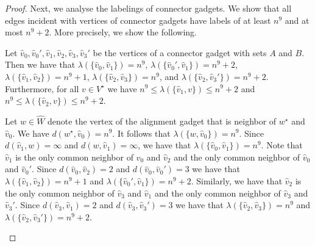 \documentclass[a4paper,UKenglish,cleveref, autoref, thm-restate]{lipics-v2021}
\begin{document}
\begin{proof}
Next, we analyse the labelings of connector gadgets. We show that all edges incident with vertices of connector gadgets have labels of at least $n^9$ and at most $n^9+2$. More precisely, we show the following.
\begin{claim}\label{claim:2}
    Let $\hat{v}_0,\hat{v}_0',\hat{v}_1,\hat{v}_2,\hat{v}_3,\hat{v}_3'$ be the vertices of a connector gadget with sets $A$ and $B$. Then we have that 
        $\lambda(\{\hat{v}_0,\hat{v}_1\})=n^9$,  $\lambda(\{\hat{v}_0',\hat{v}_1\})=n^9+2$,
        $\lambda(\{\hat{v}_1,\hat{v}_2\})=n^9+1$, $\lambda(\{\hat{v}_2,\hat{v}_3\})=n^9$, and $\lambda(\{\hat{v}_2,\hat{v}_3'\})=n^9+2$. 
        Furthermore, for all $v\in V^\star$ we have $n^9\le \lambda(\{\hat{v}_1,v\})\le n^9+2$ and $n^9\le \lambda(\{\hat{v}_2,v\}) \le n^9+2$.
\end{claim}
\begin{claimproof}
    Let $w\in \hat{W}$ denote the vertex of the alignment gadget that is neighbor of $w^\star$ and $\hat{v}_0$. We have $d(w^\star,\hat{v}_0)=n^9$. It follows that $\lambda(\{w,\hat{v}_0\})=n^9$. Since $d(\hat{v}_1,w)=\infty$ and $d(w,\hat{v}_1)=\infty$, we have that $\lambda(\{\hat{v}_0,\hat{v}_1\})=n^9$.
    Note that $\hat{v}_1$ is the only common neighbor of $\hat{v}_0$ and $\hat{v}_2$ and the only common neighbor of $\hat{v}_0$ and $\hat{v}_0'$. Since $d(\hat{v}_0,\hat{v}_2)=2$ and $d(\hat{v}_0,\hat{v}_0')=3$ we have that $\lambda(\{\hat{v}_1,\hat{v}_2\})=n^9+1$ and $\lambda(\{\hat{v}_0',\hat{v}_1\})=n^9+2$. Similarly, we have that $\hat{v}_2$ is the only common neighbor of $\hat{v}_3$ and $\hat{v}_1$ and the only common neighbor of $\hat{v}_3$ and $\hat{v}_3'$. Since $d(\hat{v}_3,\hat{v}_1)=2$ and $d(\hat{v}_3,\hat{v}_3')=3$ we have that $\lambda(\{\hat{v}_2,\hat{v}_3\})=n^9$ and $\lambda(\{\hat{v}_2,\hat{v}_3'\})=n^9+2$.


\end{claimproof}
\end{proof}
\end{document}
